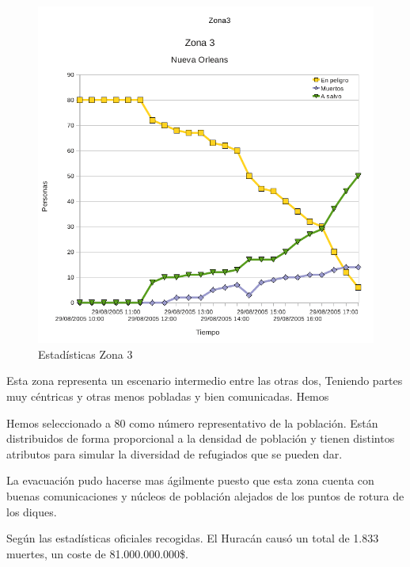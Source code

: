 \begin{figure}[H]
 \centering
 \includegraphics[width=135mm]{figuras/cap6/stats/Zona3.png}
 \caption{Estadísticas Zona 3}
\end{figure}
Esta zona representa un escenario intermedio entre las otras dos, Teniendo
partes muy céntricas y otras menos pobladas y bien comunicadas. Hemos

Hemos seleccionado a 80 como número representativo de la población.
Están
distribuidos de forma proporcional a la densidad de población y tienen
distintos atributos para simular la diversidad de refugiados que se pueden dar.

La evacuación pudo hacerse mas ágilmente puesto que esta zona cuenta con buenas
comunicaciones y núcleos de población alejados de los puntos de rotura de los
diques.

Según las estadísticas oficiales recogidas\cite{Blake07}\cite{Knabb05}. El
Huracán causó un total de 1.833 muertes, un coste de 81.000.000.000\$.


